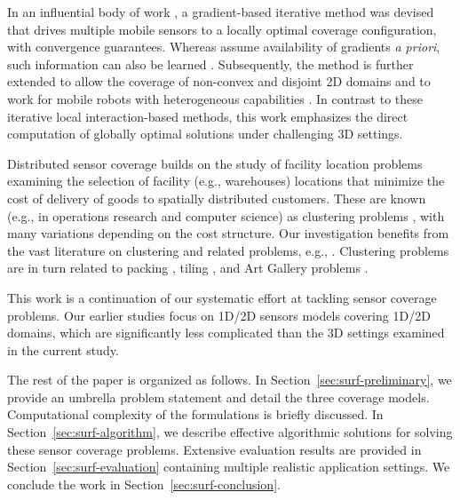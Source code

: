 In an influential body of work \cite{cortes2004coverage,martinez2007motion}, a gradient-based iterative method was devised that drives multiple mobile sensors to a locally optimal coverage configuration, with 
convergence guarantees. 
%
Whereas \cite{cortes2004coverage,martinez2007motion} assume availability of gradients {\em a priori}, such information can also be learned \cite{schwager2009decentralized}. 
%
Subsequently, the method is further extended to allow the coverage of non-convex and disjoint 2D domains \cite{schwager2009optimal} and to work for mobile robots with heterogeneous capabilities \cite{pierson2017adapting}. 
%
In contrast to these iterative local interaction-based methods, this work emphasizes the direct computation of globally optimal solutions under challenging 3D settings. 

 Distributed sensor coverage \cite{cortes2004coverage,schwager2009decentralized} builds on the study of facility location problems \cite{weber1929theory,drezner1995facility} examining the selection of facility (e.g., warehouses) locations that minimize the cost of delivery of goods to spatially distributed customers. These are known (e.g., in operations research and computer science) as clustering problems \cite{har2011geometric}, with many variations depending on the cost structure. Our investigation benefits from the vast literature on clustering and related problems, e.g., \cite{feder1988optimal,hochbaum1985best,gonzalez1985clustering,daskin2000new,shamos1975closest}.
%
Clustering problems are in turn related to packing \cite{hales2005proof}, tiling \cite{thue1910dichteste}, and Art Gallery problems \cite{o1987art,shermer1992recent}.

This work is a continuation of our systematic effort \cite{fenghangaoyu2019efficient,fengyu2020RAL,fengyu2020optimally} at tackling sensor coverage problems. Our earlier studies focus on 1D/2D sensors models covering 1D/2D domains, which are significantly less complicated than the 3D settings examined in the current study.

The rest of the paper is organized as follows. In Section~\ref{sec:surf-preliminary}, we provide an umbrella problem statement and detail the three coverage models. Computational complexity of the formulations is briefly discussed. In Section~\ref{sec:surf-algorithm}, we describe effective algorithmic solutions for solving these sensor coverage problems. Extensive evaluation results are provided in Section~\ref{sec:surf-evaluation} containing multiple realistic application settings. We conclude the work in Section~\ref{sec:surf-conclusion}.